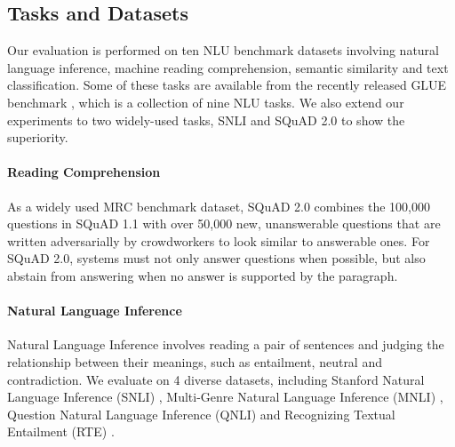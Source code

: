 \documentclass[letterpaper]{article} \usepackage{aaai20}  \usepackage{times}  \usepackage{helvet} \usepackage{courier}  \usepackage[hyphens]{url}  \usepackage{graphicx} \urlstyle{rm} \def\UrlFont{\rm}  \usepackage{graphicx}  \frenchspacing  \usepackage{amssymb}
\begin{document}
\subsection{Tasks and Datasets}
Our evaluation is performed on ten NLU benchmark datasets involving natural language inference, machine reading comprehension, semantic similarity and text classification. Some of these tasks are available from the recently released GLUE benchmark \cite{wang2018glue}, which is a collection of nine NLU tasks. We also extend our experiments to two widely-used tasks, SNLI \cite{Bowman2015A} and SQuAD 2.0 \cite{Rajpurkar2018Know} to show the superiority.

\paragraph{Reading Comprehension}
As a widely used MRC benchmark dataset, SQuAD 2.0  \cite{Rajpurkar2018Know} combines the 100,000 questions in SQuAD 1.1 \cite{Rajpurkar2016SQuAD} with over 50,000 new, unanswerable questions that are written adversarially by crowdworkers to look similar to answerable ones. For SQuAD 2.0, systems must not only answer questions when possible, but also abstain from answering when no answer is supported by the paragraph. 

\paragraph{Natural Language Inference}
Natural Language Inference involves reading a pair of sentences and judging the relationship between their meanings, such as entailment, neutral and contradiction. We evaluate on 4 diverse datasets, including Stanford Natural Language Inference (SNLI) \cite{Bowman2015A}, Multi-Genre Natural Language Inference (MNLI) \cite{nangia2017repeval}, Question Natural Language Inference (QNLI) \cite{Rajpurkar2016SQuAD} and Recognizing Textual Entailment (RTE) \cite{bentivogli2009fifth}.
\end{document}
